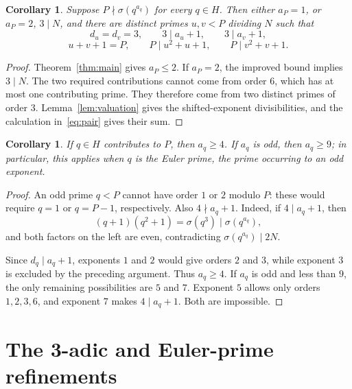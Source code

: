 \documentclass[11pt]{article}
\newtheorem{corollary}[theorem]{Corollary}
\theoremstyle{remark}
\begin{document}
\begin{corollary}\label{cor:exception}
Suppose $P\nmid\sigma(q^{a_q})$ for every $q\in H$. Then either $a_P=1$, or $a_P=2$, $3\mid N$, and there are distinct primes $u,v<P$ dividing $N$ such that
\[
 d_u=d_v=3,\qquad 3\mid a_u+1,\qquad 3\mid a_v+1,
\]
\[
 u+v+1=P,\qquad P\mid u^2+u+1,\qquad P\mid v^2+v+1.
\]
\end{corollary}
\begin{proof}
Theorem~\ref{thm:main} gives $a_P\le2$. If $a_P=2$, the improved bound implies $3\mid N$. The two required contributions cannot come from order $6$, which has at most one contributing prime. They therefore come from two distinct primes of order $3$. Lemma~\ref{lem:valuation} gives the shifted-exponent divisibilities, and the calculation in~\eqref{eq:pair} gives their sum.
\end{proof}

\begin{corollary}\label{cor:exponents}
If $q\in H$ contributes to $P$, then $a_q\ge4$. If $a_q$ is odd, then $a_q\ge9$; in particular, this applies when $q$ is the Euler prime, the prime occurring to an odd exponent.
\end{corollary}
\begin{proof}
An odd prime $q<P$ cannot have order $1$ or $2$ modulo $P$: these would require $q=1$ or $q=P-1$, respectively. Also $4\nmid a_q+1$. Indeed, if $4\mid a_q+1$, then
\[
 (q+1)(q^2+1)=\sigma(q^3)\mid\sigma(q^{a_q}),
\]
and both factors on the left are even, contradicting $\sigma(q^{a_q})\mid2N$.

Since $d_q\mid a_q+1$, exponents $1$ and $2$ would give orders $2$ and $3$, while exponent $3$ is excluded by the preceding argument. Thus $a_q\ge4$. If $a_q$ is odd and less than $9$, the only remaining possibilities are $5$ and $7$. Exponent $5$ allows only orders $1,2,3,6$, and exponent $7$ makes $4\mid a_q+1$. Both are impossible.
\end{proof}

\section{The 3-adic and Euler-prime refinements}\label{sec:three}
\end{document}
